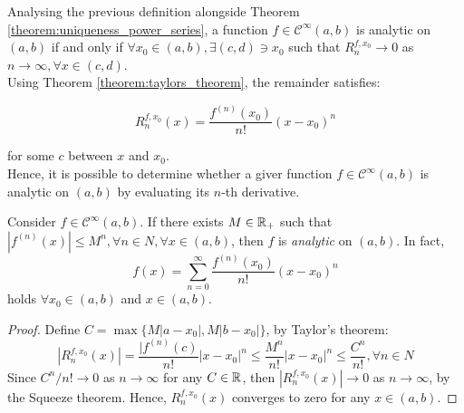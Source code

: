 Analysing the previous definition alongside Theorem \ref{theorem:uniqueness_power_series}, a function $f \in \mathcal{C}^\infty (a,b)$ is analytic on $(a,b)$ if and only if $\forall x_0\in (a,b), \exists (c,d) \ni x_0$ such that $R_n^{f, x_0} \to 0$ as $n \to \infty, \forall x \in (c,d)$. \\

Using Theorem \ref{theorem:taylors_theorem}, the remainder satisfies:

\begin{equation*}
    R_n^{f, x_0}(x) = \frac{f^{(n)}(x_0)}{n!}(x - x_0)^n
\end{equation*}

for some $c$ between $x$ and $x_0$.\\

Hence, it is possible to determine whether a giver function $f \in \mathcal{C}^\infty(a,b)$ is analytic on $(a,b)$ by evaluating its $n$-th derivative.

\begin{theorem}
    Consider $f \in \mathcal{C}^\infty(a,b)$. If there exists $M \in \mathbb{R}_+$ such that $|f^{(n)}(x)| \leq M^n, \forall n \in N, \forall x \in (a,b)$, then $f$ is \emph{analytic} on $(a,b)$. In fact,
    \begin{equation*}
        f(x) = \sum \limits_{n=0}^\infty \frac{f^{(n)}(x_0)}{n!}(x - x_0)^n
    \end{equation*}
    holds $\forall x_0 \in (a,b)$ and $x \in (a,b)$.
\end{theorem}

\begin{proof}
    Define $C = \max \{ M|a-x_0|, M|b - x_0|\}$, by Taylor's theorem:
    \begin{equation*}
        |R_n^{f, x_0}(x)| = \frac{|f^{(n)}(c)}{n!}|x-x_0|^n \leq \frac{M^n}{n!}|x - x_0|^n \leq \frac{C^n}{n!}, \forall n \in N
    \end{equation*}
    Since $C^n/n! \to 0$ as $n \to \infty$ for any $C \in \mathbb{R}$, then $|R_n^{f, x_0}(x)| \to 0$ as $n \to \infty$, by the Squeeze theorem. Hence, $R_n^{f, x_0}(x)$ converges to zero for any $x \in (a,b)$.
\end{proof}

